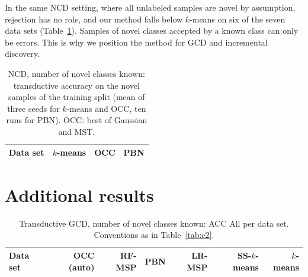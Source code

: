 \documentclass[pdflatex,sn-basic]{sn-jnl}
\begin{document}
\begin{appendices}
In the same NCD setting, where all unlabeled samples are novel by assumption, rejection has no role, and our method falls below $k$-means on six of the seven data sets (Table~\ref{tab:c1}). Samples of novel classes accepted by a known class can only be errors. This is why we position the method for GCD and incremental discovery.

\begin{table}[h]
\caption{NCD, number of novel classes known: transductive accuracy on the novel samples of the training split (mean of three seeds for $k$-means and OCC, ten runs for PBN). OCC: best of Gaussian and MST.}\label{tab:c1}
\centering\footnotesize
\begin{tabular}{@{}lrrr@{}}
\toprule
Data set & $k$-means & OCC & PBN \\
\midrule

\end{tabular}
\end{table}

\section{Additional results}\label{app:tables}

\begin{table}[h]
\caption{Transductive GCD, number of novel classes known: ACC All per data set. Conventions as in Table~\ref{tab:c2}.}\label{tab:c2known}
\centering\footnotesize
\begin{tabular}{@{}lrrrrrr@{}}
\toprule
Data set & OCC (auto) & RF-MSP & PBN & LR-MSP & SS-$k$-means & $k$-means \\
\midrule

\end{tabular}
\end{table}

\end{appendices}


\end{document}
